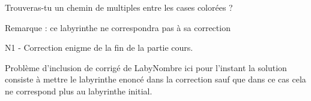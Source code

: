 \numeroteEnigme
\begin{enigme}
    Trouveras-tu un chemin de multiples entre les cases colorées ?

    \LabyNombre[Multiple=10,Longueur=12,Largeur=8,XDepart=2,YDepart=2,XArrivee=10,YArrivee=6]    

    Remarque : ce labyrinthe ne correspondra pas à sa correction
\end{enigme}

\addtocounter{exercice}{-1}
\begin{corrige}
    N1 - Correction enigme de la fin de la partie cours.  
    \LabyNombre[Multiple=10,Longueur=12,Largeur=8,XDepart=2,YDepart=2,XArrivee=10,YArrivee=6]    
    
    Problème d'inclusion de corrigé de LabyNombre ici pour l'instant la solution consiste
    à mettre le labyrinthe enoncé dans la correction sauf que dans ce cas cela ne correspond plus au labyrinthe initial.

    \LabyNombre[Multiple=10,Longueur=12,Largeur=8,XDepart=2,YDepart=2,XArrivee=10,YArrivee=6,Solution]    
\end{corrige}